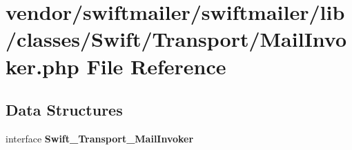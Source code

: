 \section{vendor/swiftmailer/swiftmailer/lib/classes/\+Swift/\+Transport/\+Mail\+Invoker.php File Reference}
\label{_mail_invoker_8php}
\subsection*{Data Structures}
\begin{DoxyCompactItemize}
\item 
interface {\bf Swift\+\_\+\+Transport\+\_\+\+Mail\+Invoker}
\end{DoxyCompactItemize}

